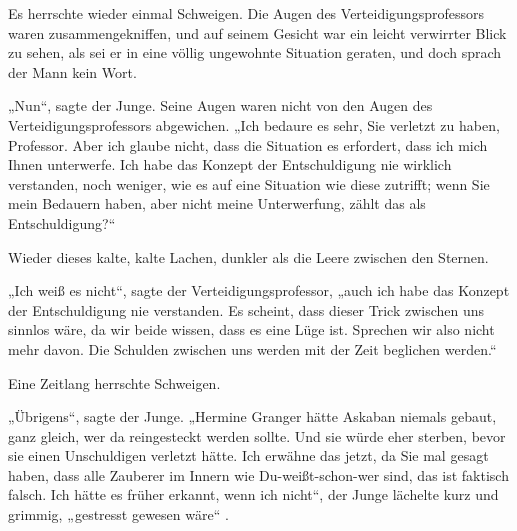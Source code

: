Es herrschte wieder einmal Schweigen. Die Augen des Verteidigungsprofessors waren zusammengekniffen, und auf seinem Gesicht war ein leicht verwirrter Blick zu sehen, als sei er in eine völlig ungewohnte Situation geraten, und doch sprach der Mann kein Wort.

„Nun“, sagte der Junge. Seine Augen waren nicht von den Augen des Verteidigungsprofessors abgewichen. „Ich bedaure es sehr, Sie verletzt zu haben, Professor. Aber ich glaube nicht, dass die Situation es erfordert, dass ich mich Ihnen unterwerfe. Ich habe das Konzept der Entschuldigung nie wirklich verstanden, noch weniger, wie es auf eine Situation wie diese zutrifft; wenn Sie mein Bedauern haben, aber nicht meine Unterwerfung, zählt das als Entschuldigung?“

Wieder dieses kalte, kalte Lachen, dunkler als die Leere zwischen den Sternen.

„Ich weiß es nicht“, sagte der Verteidigungsprofessor, „auch ich habe das Konzept der Entschuldigung nie verstanden. Es scheint, dass dieser Trick zwischen uns sinnlos wäre, da wir beide wissen, dass es eine Lüge ist. Sprechen wir also nicht mehr davon. Die Schulden zwischen uns werden mit der Zeit beglichen werden.“

Eine Zeitlang herrschte Schweigen.

„Übrigens“, sagte der Junge. „Hermine Granger hätte Askaban niemals gebaut, ganz gleich, wer da reingesteckt werden sollte. Und sie würde eher sterben, bevor sie einen Unschuldigen verletzt hätte. Ich erwähne das jetzt, da Sie mal gesagt haben, dass alle Zauberer im Innern wie Du-weißt-schon-wer sind, das ist faktisch falsch. Ich hätte es früher erkannt, wenn ich nicht“, der Junge lächelte kurz und grimmig, „gestresst gewesen wäre“ .

